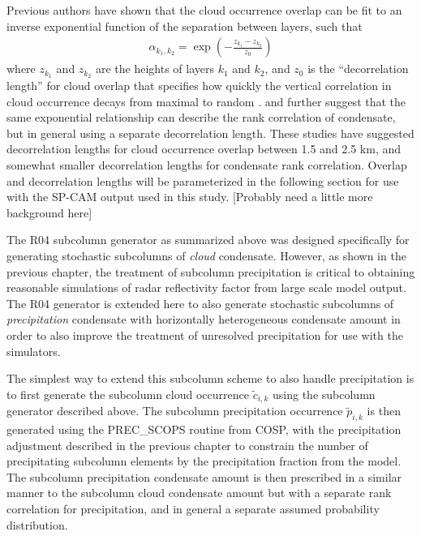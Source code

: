 Previous authors have shown that the cloud occurrence overlap can be fit to an inverse exponential function of the separation between layers, such that
\begin{gather}
    \alpha_{k_1, k_2} = \exp\left(-\frac{z_{k_1} - z_{k_2}}{z_0}\right)
    \label{alpha_exponential_equation}
\end{gather}
where $z_{k_1}$ and $z_{k_2}$ are the heights of layers $k_1$ and $k_2$, and $z_0$ is the ``decorrelation length'' for cloud overlap that specifies how quickly
the vertical correlation in cloud occurrence decays from maximal to random
\citep{hogan_and_illingworth_2000, mace_and_benson-troth_2002,
raisanen_et_al_2004, pincus_et_al_2005, barker_2008}. \cite{raisanen_et_al_2004} and \cite{pincus_et_al_2005} further
suggest that the same exponential relationship can describe the rank
correlation of condensate, but in general using a separate decorrelation length.
These studies have suggested decorrelation lengths for cloud occurrence overlap between 1.5 and 2.5 km, and somewhat smaller decorrelation lengths for condensate rank correlation. Overlap and decorrelation lengths will be parameterized in the following section for use with the SP-CAM output used in this study. [Probably need a little more background here]

The R04 subcolumn generator as summarized above was designed specifically for generating stochastic subcolumns of \emph{cloud} condensate. However, as shown in the previous chapter, the treatment of subcolumn precipitation is critical to obtaining reasonable simulations of radar reflectivity factor from large scale model output. The R04 generator is extended here to also generate stochastic subcolumns of \emph{precipitation} condensate with horizontally heterogeneous condensate amount in order to also improve the treatment of unresolved precipitation for use with the simulators. 

The simplest way to extend this subcolumn scheme to also handle precipitation is to first generate the subcolumn cloud occurrence $\tilde{c}_{i, k}$ using the subcolumn generator described above. The subcolumn precipitation occurrence $\tilde{p}_{i, k}$ is then generated using the PREC\_SCOPS routine from COSP, with the precipitation adjustment described in the previous chapter to constrain the number of precipitating subcolumn elements by the precipitation fraction from the model. The subcolumn precipitation condensate amount is then prescribed in a similar manner to the subcolumn cloud condensate amount but with a separate rank correlation for precipitation, and in general a separate assumed probability distribution.

